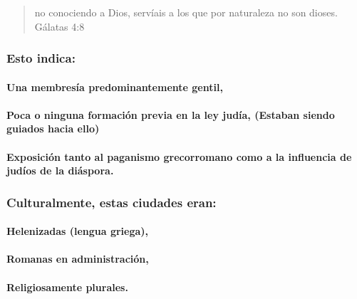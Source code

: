 \documentclass[11a pt,twoside]{article}
\let\oldsubsubsection\subsubsection
\renewcommand{\subsubsection}{\needspace{4\baselineskip}\oldsubsubsection}
\let\oldparagraph\paragraph
\renewcommand{\paragraph}{\needspace{3\baselineskip}\oldparagraph}
\begin{document}
\begin{quote}
no conociendo a Dios, servíais a los que por naturaleza no son dioses.
Gálatas 4:8
\end{quote}

\subsubsection{Esto indica:}\label{esto-indica}

\paragraph{Una membresía predominantemente
gentil,}\label{una-membresuxeda-predominantemente-gentil}

\paragraph{Poca o ninguna formación previa en la ley judía, (Estaban
siendo guiados hacia
ello)}\label{poca-o-ninguna-formaciuxf3n-previa-en-la-ley-juduxeda-estaban-siendo-guiados-hacia-ello}

\paragraph{Exposición tanto al paganismo grecorromano como a la
influencia de judíos de la
diáspora.}\label{exposiciuxf3n-tanto-al-paganismo-grecorromano-como-a-la-influencia-de-juduxedos-de-la-diuxe1spora.}

\subsubsection{Culturalmente, estas ciudades
eran:}\label{culturalmente-estas-ciudades-eran}

\paragraph{Helenizadas (lengua
griega),}\label{helenizadas-lengua-griega}

\paragraph{Romanas en
administración,}\label{romanas-en-administraciuxf3n}

\paragraph{Religiosamente plurales.}\label{religiosamente-plurales.}
\end{document}

